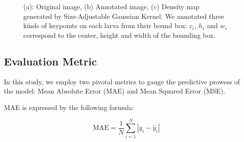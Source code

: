 \documentclass[journal]{IEEEtran}
\begin{document}
\begin{figure}[h]
        \centering
        \caption{(a): Original image, (b) Annotated image, (c) Density map generated by Size-Adjustable Gaussian Kernel. We annotated three kinds of keypoints on each larva from their bound box: $c_i$, $h_i$ and $w_i$ correspond to the center, height and width of the bounding box. }
        \label{fig3}
\end{figure}

\subsection{Evaluation Metric}
In this study, we employ two pivotal metrics to gauge the predictive prowess of the model: Mean Absolute Error (MAE) and Mean Squared Error (MSE).

MAE is expressed by the following formula:

\[
\text{MAE} = \frac{1}{N} \sum_{i=1}^{N} \left| y_i - \hat{y}_i \right|
\]
\end{document}
